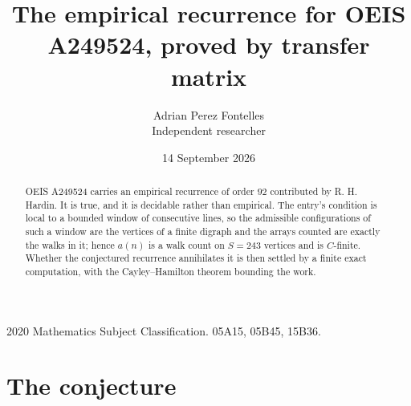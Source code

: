 \documentclass[11pt,a4paper]{article}
\title{The empirical recurrence for OEIS A249524, proved by transfer matrix}
\author{Adrian Perez Fontelles\\ \small Independent researcher}
\date{14 September 2026}
\theoremstyle{plain}
\theoremstyle{definition}
\begin{document}
\maketitle

\begin{abstract}
OEIS A249524 carries an empirical recurrence of order $92$ contributed by R. H. Hardin. It is
true, and it is decidable rather than empirical. The entry's condition is local to a bounded window of consecutive lines, so
the admissible configurations of such a window are the vertices of a finite digraph and the
arrays counted are exactly the walks in it; hence $a(n)$ is a walk count on $S=243$ vertices
and is $C$-finite. Whether the conjectured recurrence annihilates it is then settled by a
finite exact computation, with the Cayley--Hamilton theorem bounding the work.
\end{abstract}

\noindent\small 2020 Mathematics Subject Classification. 05A15, 05B45, 15B36.\normalsize

\section{The conjecture}
\end{document}
